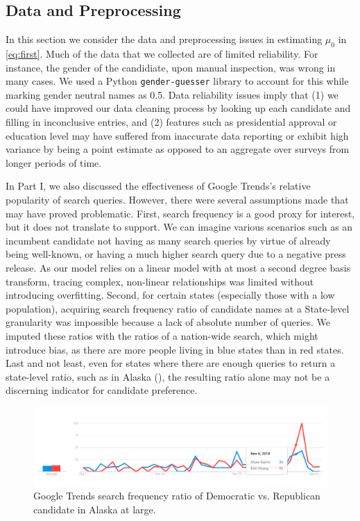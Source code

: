 \documentclass[12pt]{article}
\begin{document}
\subsection{Data and Preprocessing}
In this section we consider the data and preprocessing issues in estimating $\mu_0$ in \eqref{eq:first}. Much of the data that we collected are of limited reliability. For instance, the gender of the candidiate, upon manual inspection, was wrong in many cases. We used a Python \texttt{gender-guesser} library to account for this while marking gender neutral names as 0.5. Data reliability issues imply that (1) we could have improved our data cleaning process by looking up each candidate and filling in inconclusive entries, and (2) features such as presidential approval or education level may have suffered from inaccurate data reporting or exhibit high variance by being a point estimate as opposed to an aggregate over surveys from longer periods of time. 

In Part I, we also discussed the effectiveness of Google Trends's relative
popularity of search queries. However, there were several assumptions made that
may have proved problematic. First, search frequency is a good proxy
for interest, but it does not translate to support. We can imagine various
scenarios such as an incumbent candidate not having as many search queries by
virtue of already being well-known, or having a much higher search query due to
a negative press release. As our model relies on a linear model with at most a
second degree basis transform, tracing complex, non-linear relationships was
limited without introducing overfitting. Second, for certain
states (especially those with a low population), acquiring search frequency
ratio of candidate names at a State-level granularity was impossible because a
lack of absolute number of queries. We imputed these ratios with the ratios of a
nation-wide search, which might introduce bias, as there are more people living in blue states than in red states. Last and not least, even for states
where there are enough queries to return a state-level ratio, such as in Alaska
(), the resulting ratio alone may not be a discerning
indicator for candidate preference.

\begin{figure}[tbh]
  \centering
  \includegraphics[scale=0.4]{alaska_candidate}
  \caption{Google Trends search frequency ratio of Democratic vs. Republican candidate in Alaska at large.}
  \label{fig:candidate_only}
\end{figure}
\end{document}
